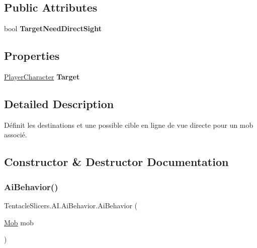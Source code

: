 \subsection*{Public Attributes}
\begin{DoxyCompactItemize}
\item 
\mbox{\label{class_tentacle_slicers_1_1_a_i_1_1_ai_behavior_a00bef1a35b20ad21450309f3c0b22d85}} 
bool {\bfseries Target\+Need\+Direct\+Sight}
\end{DoxyCompactItemize}
\subsection*{Properties}
\begin{DoxyCompactItemize}
\item 
\mbox{\label{class_tentacle_slicers_1_1_a_i_1_1_ai_behavior_ab6f6e914f3aba2337d8eb625836d8041}} 
\hyperlink{class_tentacle_slicers_1_1actors_1_1_player_character}{Player\+Character} {\bfseries Target}
\end{DoxyCompactItemize}


\subsection{Detailed Description}
Définit les destinations et une possible cible en ligne de vue directe pour un mob associé. 



\subsection{Constructor \& Destructor Documentation}
\mbox{\label{class_tentacle_slicers_1_1_a_i_1_1_ai_behavior_a1aa1d81aed97a3259a55768fd442f421}} 
\subsubsection{\texorpdfstring{Ai\+Behavior()}{AiBehavior()}}
{\footnotesize\ttfamily Tentacle\+Slicers.\+A\+I.\+Ai\+Behavior.\+Ai\+Behavior (\begin{DoxyParamCaption}\item[{\hyperlink{class_tentacle_slicers_1_1actors_1_1_mob}{Mob}}]{mob }\end{DoxyParamCaption})}



